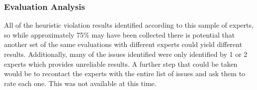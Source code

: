 \documentclass[a4 paper, 12pt]{article}
\begin{document}


    \subsubsection{Evaluation Analysis}
     All of the heuristic violation results identified according to this sample of experts, so while approximately 75\% may have been collected there is potential that another set of the same evaluations with different experts could yield different results. Additionally, many of the issues identified were only identified by 1 or 2 experts which provides unreliable results. A further step that could be taken would be to recontact the experts with the entire list of issues and ask them to rate each one. This was not available at this time.  
\end{document}
